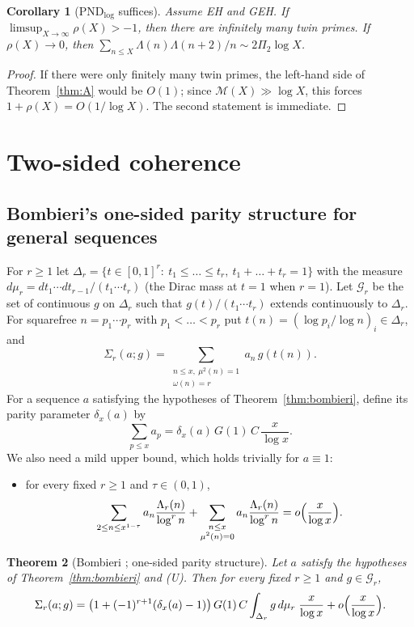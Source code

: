 \documentclass[11pt]{amsart}
\newtheorem{theorem}{Theorem}[section]
\newtheorem{corollary}[theorem]{Corollary}
\theoremstyle{definition}
\theoremstyle{remark}
\begin{document}
\begin{corollary}[PND$_{\log}$ suffices]\label{cor:pnd}
Assume EH and GEH. If $\limsup_{X\to\infty}\rho(X)>-1$, then there are infinitely many twin primes. If $\rho(X)\to0$, then $\sum_{n\le X}\Lambda(n)\Lambda(n+2)/n\sim2\Pi_2\log X$.
\end{corollary}
\begin{proof}
If there were only finitely many twin primes, the left-hand side of Theorem~\ref{thm:A} would be $O(1)$; since $\mathcal M(X)\gg\log X$, this forces $1+\rho(X)=O(1/\log X)$. The second statement is immediate.
\end{proof}

\section{Two-sided coherence}\label{sec:coherence}

\subsection{Bombieri's one-sided parity structure for general sequences}
For $r\ge1$ let $\Delta_r=\{t\in[0,1]^r:\ t_1\le\dots\le t_r,\ t_1+\dots+t_r=1\}$ with the measure $d\mu_r=dt_1\cdots dt_{r-1}/(t_1\cdots t_r)$ (the Dirac mass at $t=1$ when $r=1$). Let $\mathcal G_r$ be the set of continuous $g$ on $\Delta_r$ such that $g(t)/(t_1\cdots t_r)$ extends continuously to $\Delta_r$. For squarefree $n=p_1\cdots p_r$ with $p_1<\dots<p_r$ put $t(n)=(\log p_i/\log n)_i\in\Delta_r$, and
\[
\Sigma_r(a;g)=\sum_{\substack{n\le x,\ \mu^2(n)=1\\ \omega(n)=r}}a_n\,g(t(n)).
\]
For a sequence $a$ satisfying the hypotheses of Theorem~\ref{thm:bombieri}, define its parity parameter $\delta_x(a)$ by
\[
\sum_{p\le x}a_p=\delta_x(a)\,G(1)\,C\,\frac{x}{\log x}.
\]
We also need a mild upper bound, which holds trivially for $a\equiv1$:
\begin{itemize}
\item[(U)] for every fixed $r\ge1$ and $\tau\in(0,1)$,
\[
\sum_{2\le n\le x^{1-\tau}}a_n\frac{\Lambda_r(n)}{\log^rn}+\sum_{\substack{n\le x\\ \mu^2(n)=0}}a_n\frac{\Lambda_r(n)}{\log^rn}=o\Bigl(\frac{x}{\log x}\Bigr).
\]
\end{itemize}

\begin{theorem}[Bombieri \cite{Bom76}; one-sided parity structure]\label{thm:onesided}
Let $a$ satisfy the hypotheses of Theorem~\ref{thm:bombieri} and (U). Then for every fixed $r\ge1$ and $g\in\mathcal G_r$,
\[
\Sigma_r(a;g)=\bigl(1+(-1)^{r+1}(\delta_x(a)-1)\bigr)\,G(1)\,C\int_{\Delta_r}g\,d\mu_r\;\frac{x}{\log x}+o\Bigl(\frac{x}{\log x}\Bigr).
\]
\end{theorem}
\end{document}
